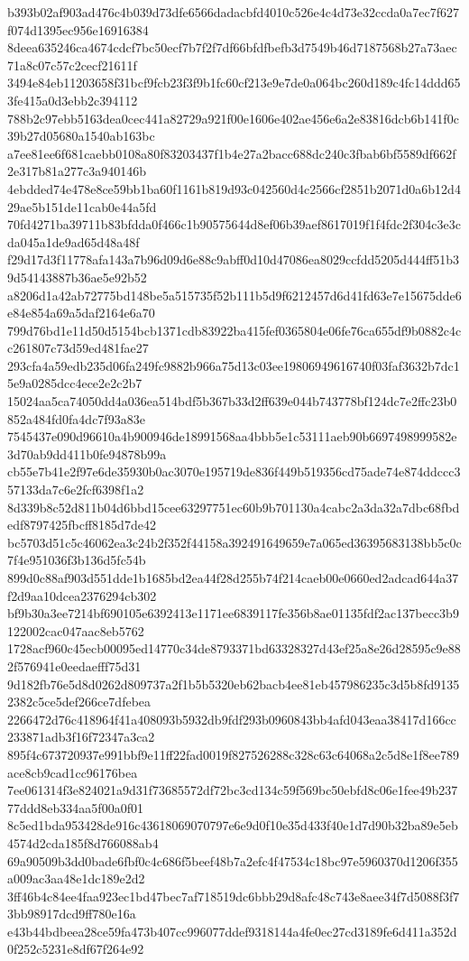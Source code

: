 {b393b02af903ad476c4b039d73dfe6566dadacbfd4010c526e4c4d73e32ccda0a7ec7f627f074d1395ec956e16916384
8deea635246ca4674cdcf7bc50ecf7b7f2f7df66bfdfbefb3d7549b46d7187568b27a73aec71a8c07c57c2cecf21611f
3494e84eb11203658f31bcf9fcb23f3f9b1fc60cf213e9e7de0a064bc260d189c4fc14ddd653fe415a0d3ebb2c394112
788b2c97ebb5163dea0cec441a82729a921f00e1606e402ae456e6a2e83816dcb6b141f0c39b27d05680a1540ab163bc
a7ee81ee6f681caebb0108a80f83203437f1b4e27a2bacc688dc240c3fbab6bf5589df662f2e317b81a277c3a940146b
4ebdded74e478e8ce59bb1ba60f1161b819d93c042560d4c2566cf2851b2071d0a6b12d429ae5b151de11cab0e44a5fd
70fd4271ba39711b83bfdda0f466c1b90575644d8ef06b39aef8617019f1f4fdc2f304c3e3cda045a1de9ad65d48a48f
f29d17d3f11778afa143a7b96d09d6e88c9abff0d10d47086ea8029ccfdd5205d444ff51b39d54143887b36ae5e92b52
a8206d1a42ab72775bd148be5a515735f52b111b5d9f6212457d6d41fd63e7e15675dde6e84e854a69a5daf2164e6a70
799d76bd1e11d50d5154bcb1371cdb83922ba415fef0365804e06fe76ca655df9b0882c4cc261807c73d59ed481fae27
293cfa4a59edb235d06fa249fc9882b966a75d13c03ee19806949616740f03faf3632b7dc15e9a0285dcc4ece2e2c2b7
15024aa5ca74050dd4a036ea514bdf5b367b33d2ff639e044b743778bf124dc7e2ffc23b0852a484fd0fa4dc7f93a83e
7545437e090d96610a4b900946de18991568aa4bbb5e1c53111aeb90b6697498999582e3d70ab9dd411b0fe94878b99a
cb55e7b41e2f97e6de35930b0ac3070e195719de836f449b519356cd75ade74e874ddccc357133da7c6e2fcf6398f1a2
8d339b8c52d811b04d6bbd15cee63297751ec60b9b701130a4cabc2a3da32a7dbc68fbdedf8797425fbcff8185d7de42
bc5703d51c5c46062ea3c24b2f352f44158a392491649659e7a065ed36395683138bb5c0c7f4e951036f3b136d5fc54b
899d0c88af903d551dde1b1685bd2ea44f28d255b74f214caeb00e0660ed2adcad644a37f2d9aa10dcea2376294cb302
bf9b30a3ee7214bf690105e6392413e1171ee6839117fe356b8ae01135fdf2ac137becc3b9122002cac047aac8eb5762
1728acf960c45ecb00095ed14770c34de8793371bd63328327d43ef25a8e26d28595c9e882f576941e0eedaefff75d31
9d182fb76e5d8d0262d809737a2f1b5b5320eb62bacb4ee81eb457986235c3d5b8fd91352382c5ce5def266ce7dfebea
2266472d76c418964f41a408093b5932db9fdf293b0960843bb4afd043eaa38417d166cc233871adb3f16f72347a3ca2
895f4c673720937e991bbf9e11ff22fad0019f827526288c328c63c64068a2c5d8e1f8ee789ace8cb9cad1cc96176bea
7ee061314f3e824021a9d31f73685572df72bc3cd134c59f569bc50ebfd8c06e1fee49b23777ddd8eb334aa5f00a0f01
8c5ed1bda953428de916c43618069070797e6e9d0f10e35d433f40e1d7d90b32ba89e5eb4574d2cda185f8d766088ab4
69a90509b3dd0bade6fbf0c4c686f5beef48b7a2efc4f47534c18bc97e5960370d1206f355a009ac3aa48e1dc189e2d2
3ff46b4c84ee4faa923ec1bd47bec7af718519dc6bbb29d8afc48c743e8aee34f7d5088f3f73bb98917dcd9ff780e16a
e43b44bdbeea28ce59fa473b407cc996077ddef9318144a4fe0ec27cd3189fe6d411a352d0f252c5231e8df67f264e92
}

